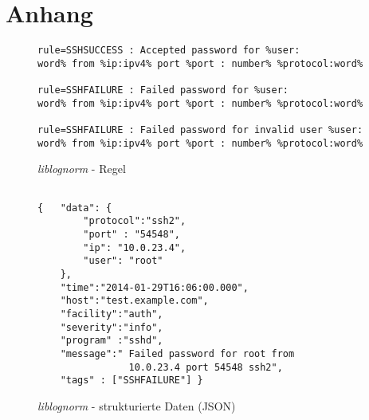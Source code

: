 \chapter*{Anhang}\label{appendix}
\thispagestyle{fancy}

\begin{figure}[h]
    \caption{\textit{liblognorm} - Regel}
    \label{app:liblognorm-rule}\vspace{0.2cm}
    \centering
\begin{minipage}{0.8\textwidth}
\begin{verbatim}
rule=SSHSUCCESS : Accepted password for %user:
word% from %ip:ipv4% port %port : number% %protocol:word%

rule=SSHFAILURE : Failed password for %user:
word% from %ip:ipv4% port %port : number% %protocol:word%

rule=SSHFAILURE : Failed password for invalid user %user:
word% from %ip:ipv4% port %port : number% %protocol:word%

\end{verbatim}
\end{minipage}
\end{figure}


\begin{figure}[h]
    \caption{\textit{liblognorm} - strukturierte Daten (JSON)}
    \label{app:liblognorm-normalisation}\vspace{0.2cm}
    \centering
    \begin{minipage}{0.8\textwidth}
\begin{verbatim}
        
{   "data": {
        "protocol":"ssh2",
        "port" : "54548",
        "ip": "10.0.23.4",
        "user": "root"
    },
    "time":"2014-01-29T16:06:00.000",
    "host":"test.example.com",
    "facility":"auth",
    "severity":"info",
    "program" :"sshd",
    "message":" Failed password for root from
                10.0.23.4 port 54548 ssh2",
    "tags" : ["SSHFAILURE"] }
\end{verbatim}
\end{minipage}
\end{figure}


